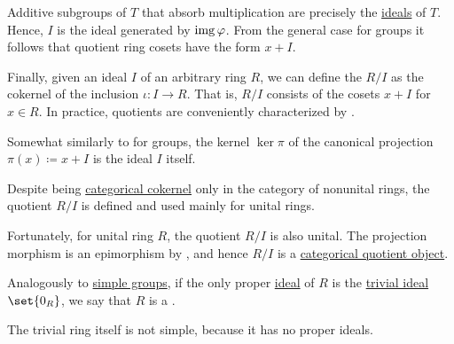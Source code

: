 \begin{definition}
\begin{thmenum}
    Additive subgroups of \( T \) that absorb multiplication are precisely the \hyperref[def:semiring_ideal]{ideals} of \( T \). Hence, \( I \) is the ideal generated by \( \operatorname{img} \varphi \). From the general case for groups it follows that quotient ring cosets have the form \( x + I \).

    Finally, given an ideal \( I \) of an arbitrary ring \( R \), we can define the  \( R / I \) as the cokernel of the inclusion \( \iota: I \to R \). That is, \( R / I \) consists of the cosets \( x + I \) for \( x \in R \). In practice, quotients are conveniently characterized by .

    Somewhat similarly to  for groups, the kernel \( \ker \pi \) of the canonical projection \( \pi(x) \coloneqq x + I \) is the ideal \( I \) itself.

    Despite being \hyperref[def:zero_morphisms/cokernel]{categorical cokernel} only in the category of nonunital rings, the quotient \( R / I \) is defined and used mainly for unital rings.

    Fortunately, for unital ring \( R \), the quotient \( R / I \) is also unital. The projection morphism is an epimorphism by , and hence \( R / I \) is a \hyperref[def:subobject_and_quotient]{categorical quotient object}.

     Analogously to \hyperref[def:group/simple]{simple groups}, if the only proper \hyperref[def:semiring_ideal]{ideal} of \( R \) is the \hyperref[def:ring/trivial]{trivial ideal} \( \set{ 0_R } \), we say that \( R \) is a .

    The trivial ring itself is not simple, because it has no proper ideals.
  \end{thmenum}
\end{definition}

